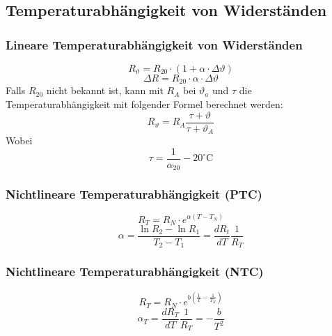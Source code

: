 



\subsection{Temperaturabhängigkeit von Widerständen}

\subsubsection{Lineare Temperaturabhängigkeit von Widerständen}
\[ R_\vartheta = R_{20} \cdot (1 + \alpha \cdot \Delta \vartheta) \]
\[ \Delta R = R_{20} \cdot \alpha \cdot \Delta \vartheta \]
Falls $R_{20}$ nicht bekannt ist, kann mit $R_A$ bei $\vartheta_a$ und $\tau$ die Temperaturabhängigkeit mit folgender Formel berechnet werden:  \[ R_\vartheta = R_A \frac{\tau + \vartheta}{\tau + \vartheta_A} \]
Wobei 
\[ \tau = \frac{1}{\alpha_20} - 20^{\circ}\text{C} \]

\subsubsection{Nichtlineare Temperaturabhängigkeit (PTC)}
\[ R_T = R_N \cdot e^{\alpha (T - T_N)} \]
\[ \alpha = \frac{\ln R_2 - \ln R_1}{T_2 - T_1} = \frac{d R_t}{d T}\frac{1}{R_T} \]

\subsubsection{Nichtlineare Temperaturabhängigkeit (NTC)}
\[ R_T = R_N \cdot e^{b\left(\frac{1}{T} - \frac{1}{T_N}\right)} \]
\[ \alpha_T = \frac{d R_T}{d T}\frac{1}{R_T} = -\frac{b}{T^2} \]